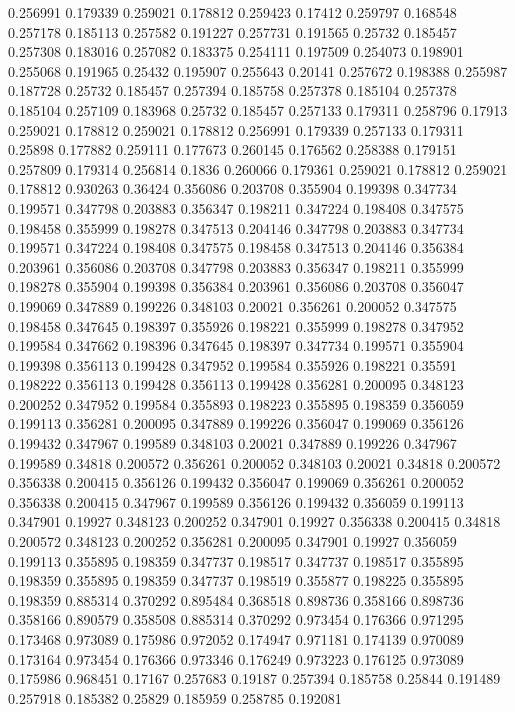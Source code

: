 0.256991 0.179339
0.259021 0.178812
0.259423 0.17412
0.259797 0.168548
0.257178 0.185113
0.257582 0.191227
0.257731 0.191565
0.25732 0.185457
0.257308 0.183016
0.257082 0.183375
0.254111 0.197509
0.254073 0.198901
0.255068 0.191965
0.25432 0.195907
0.255643 0.20141
0.257672 0.198388
0.255987 0.187728
0.25732 0.185457
0.257394 0.185758
0.257378 0.185104
0.257378 0.185104
0.257109 0.183968
0.25732 0.185457
0.257133 0.179311
0.258796 0.17913
0.259021 0.178812
0.259021 0.178812
0.256991 0.179339
0.257133 0.179311
0.25898 0.177882
0.259111 0.177673
0.260145 0.176562
0.258388 0.179151
0.257809 0.179314
0.256814 0.1836
0.260066 0.179361
0.259021 0.178812
0.259021 0.178812
0.930263 0.36424
0.356086 0.203708
0.355904 0.199398
0.347734 0.199571
0.347798 0.203883
0.356347 0.198211
0.347224 0.198408
0.347575 0.198458
0.355999 0.198278
0.347513 0.204146
0.347798 0.203883
0.347734 0.199571
0.347224 0.198408
0.347575 0.198458
0.347513 0.204146
0.356384 0.203961
0.356086 0.203708
0.347798 0.203883
0.356347 0.198211
0.355999 0.198278
0.355904 0.199398
0.356384 0.203961
0.356086 0.203708
0.356047 0.199069
0.347889 0.199226
0.348103 0.20021
0.356261 0.200052
0.347575 0.198458
0.347645 0.198397
0.355926 0.198221
0.355999 0.198278
0.347952 0.199584
0.347662 0.198396
0.347645 0.198397
0.347734 0.199571
0.355904 0.199398
0.356113 0.199428
0.347952 0.199584
0.355926 0.198221
0.35591 0.198222
0.356113 0.199428
0.356113 0.199428
0.356281 0.200095
0.348123 0.200252
0.347952 0.199584
0.355893 0.198223
0.355895 0.198359
0.356059 0.199113
0.356281 0.200095
0.347889 0.199226
0.356047 0.199069
0.356126 0.199432
0.347967 0.199589
0.348103 0.20021
0.347889 0.199226
0.347967 0.199589
0.34818 0.200572
0.356261 0.200052
0.348103 0.20021
0.34818 0.200572
0.356338 0.200415
0.356126 0.199432
0.356047 0.199069
0.356261 0.200052
0.356338 0.200415
0.347967 0.199589
0.356126 0.199432
0.356059 0.199113
0.347901 0.19927
0.348123 0.200252
0.347901 0.19927
0.356338 0.200415
0.34818 0.200572
0.348123 0.200252
0.356281 0.200095
0.347901 0.19927
0.356059 0.199113
0.355895 0.198359
0.347737 0.198517
0.347737 0.198517
0.355895 0.198359
0.355895 0.198359
0.347737 0.198519
0.355877 0.198225
0.355895 0.198359
0.885314 0.370292
0.895484 0.368518
0.898736 0.358166
0.898736 0.358166
0.890579 0.358508
0.885314 0.370292
0.973454 0.176366
0.971295 0.173468
0.973089 0.175986
0.972052 0.174947
0.971181 0.174139
0.970089 0.173164
0.973454 0.176366
0.973346 0.176249
0.973223 0.176125
0.973089 0.175986
0.968451 0.17167
0.257683 0.19187
0.257394 0.185758
0.25844 0.191489
0.257918 0.185382
0.25829 0.185959
0.258785 0.192081
